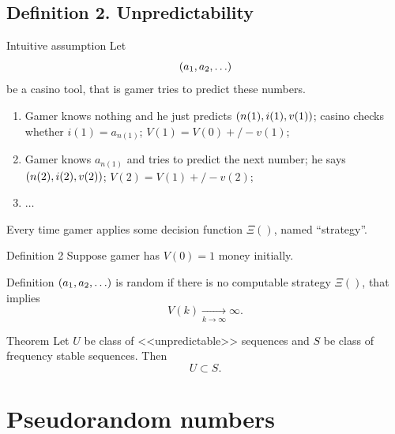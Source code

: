 \documentclass[12pt]{beamer}
\begin{document}
 \subsection{Definition 2. Unpredictability}
 \begin{frame}{Intuitive assumption}
 Let $$\left(a_1, a_2, \ldots\right)$$ be a casino tool, that is gamer tries to predict these numbers.
 \begin{enumerate}
  \item Gamer knows nothing and he just predicts $\left(n(1), i(1), v(1)\right)$; casino checks whether $i(1) = a_{n(1)}$; $V(1) = V(0) +/- v(1)$;
  \item Gamer knows $a_{n(1)}$ and tries to predict the next number; he says $\left(n(2), i(2), v(2)\right)$; $V(2) = V(1) +/- v(2)$;
  \item $\ldots$
 \end{enumerate}
Every time gamer applies some decision function $\Xi()$, named ``strategy''.
 \end{frame}
 
 \begin{frame}{Definition 2}
  Suppose gamer has $V(0) = 1$ money initially.
  \begin{block}{Definition}
   $\left(a_1, a_2, \ldots\right)$ is random if there is no computable strategy $\Xi()$, that implies 
   $$V(k) \xrightarrow[k \to \infty]{}  \infty.$$
  \end{block}
  
  \begin{block}{Theorem}
  Let $U$ be class of <<unpredictable>> sequences and $S$ be class of frequency stable sequences. 
  Then $$U \subset S.$$
  \end{block}
\end{frame}

\section{Pseudorandom numbers}
\end{document}
